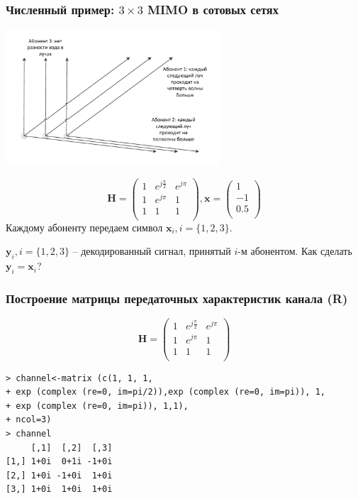 \documentclass[utf8]{beamer}
\begin{document}
\begin{frame}
\frametitle{Численный пример: $3\times3$ MIMO  в сотовых сетях}
\begin{center}
\includegraphics[width=0.6\textwidth]{pic/MIMO-example.pdf}
\end{center}
$$
\mathbf{H} =
\left(
\begin{array}{ccc}
1 & e^{j\frac{\pi}{2}} & e^{j\pi}\\
1 & e^{j\pi}           & 1       \\
1 &  1                 & 1       \\
\end{array}
\right),
\mathbf{x} =
\left(
\begin{array}{c}
1 \\ -1 \\ 0.5 \\
\end{array}
\right)
$$
Каждому абоненту передаем символ $\mathbf{x}_i, i=\{1,2,3\}$.

$\mathbf{y}_i, i=\{1,2,3\}$ -- декодированный сигнал, принятый $i$-м абонентом. Как сделать $\mathbf{y}_i = \mathbf{x}_i$?
\end{frame}
\begin{frame}[fragile]
\frametitle{Построение матрицы передаточных характеристик канала (R)}
$$
\mathbf{H} =
\left(
\begin{array}{ccc}
1 & e^{j\frac{\pi}{2}} & e^{j\pi}\\
1 & e^{j\pi}           & 1       \\
1 &  1                 & 1       \\
\end{array}
\right)
$$
{
\tiny
\begin{verbatim}
> channel<-matrix (c(1, 1, 1,
+ exp (complex (re=0, im=pi/2)),exp (complex (re=0, im=pi)), 1,
+ exp (complex (re=0, im=pi)), 1,1),
+ ncol=3)
> channel
     [,1]  [,2]  [,3]
[1,] 1+0i  0+1i -1+0i
[2,] 1+0i -1+0i  1+0i
[3,] 1+0i  1+0i  1+0i
\end{verbatim}
}
\end{frame}
\end{document}
